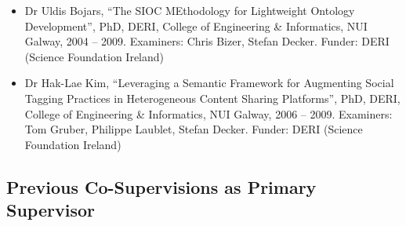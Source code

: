 \documentclass[10pt,a4paper]{res} %
\begin{document}
\begin{resume}
\begin{itemize}
\item Dr Uldis Bojars, ``The SIOC MEthodology for Lightweight Ontology Development'', PhD, DERI, College of Engineering \& Informatics, NUI Galway, 2004 -- 2009. Examiners: Chris Bizer, Stefan Decker. Funder: DERI (Science Foundation Ireland) %
\item Dr Hak-Lae Kim, ``Leveraging a Semantic Framework for Augmenting Social Tagging Practices in Heterogeneous Content Sharing Platforms'', PhD, DERI, College of Engineering \& Informatics, NUI Galway, 2006 -- 2009. Examiners: Tom Gruber, Philippe Laublet, Stefan Decker. Funder: DERI (Science Foundation Ireland) %
\end{itemize}

\subsection*{Previous Co-Supervisions as Primary Supervisor}


\end{resume}
\end{document}

